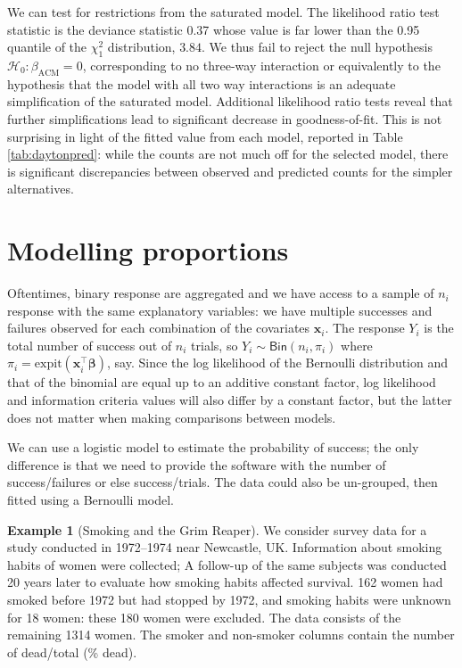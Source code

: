 \documentclass[
  11pt,
  letterpaper,
]{book}
\theoremstyle{definition}
\theoremstyle{definition}
\newtheorem{example}{Example}[chapter]
\theoremstyle{definition}
\theoremstyle{definition}
\theoremstyle{remark}
\begin{document}
We can test for restrictions from the saturated model. The likelihood ratio test statistic is the deviance statistic 0.37 whose value is far lower than the 0.95 quantile of the \(\chi^2_1\) distribution, \(3.84\). We thus fail to reject the null hypothesis \(\mathscr{H}_0:\beta_{\mathrm{ACM}}=0\), corresponding to no three-way interaction or equivalently to the hypothesis that the model with all two way interactions is an adequate simplification of the saturated model. Additional likelihood ratio tests reveal that further simplifications lead to significant decrease in goodness-of-fit. This is not surprising in light of the fitted value from each model, reported in Table \ref{tab:daytonpred}: while the counts are not much off for the selected model, there is significant discrepancies between observed and predicted counts for the simpler alternatives.

\hypertarget{modelling-proportions}{%
\section{Modelling proportions}\label{modelling-proportions}}

Oftentimes, binary response are aggregated and we have access to a sample of \(n_i\) response with the same explanatory variables: we have multiple successes and failures observed for each combination of the covariates \(\mathbf{x}_i\). The response \(Y_i\) is the total number of success out of \(n_i\) trials, so \(Y_i \sim \mathsf{Bin}(n_i, \pi_i)\) where \(\pi_i = \mathrm{expit}(\mathbf{x}_i^\top\boldsymbol{\beta})\), say. Since the log likelihood of the Bernoulli distribution and that of the binomial are equal up to an additive constant factor, log likelihood and information criteria values will also differ by a constant factor, but the latter does not matter when making comparisons between models.

We can use a logistic model to estimate the probability of success; the only difference is that we need to provide the software with the number of success/failures or else success/trials. The data could also be un-grouped, then fitted using a Bernoulli model.

\begin{example}[Smoking and the Grim Reaper]
\protect\hypertarget{exm:smokingSimpson}{}{\label{exm:smokingSimpson} {} }We consider survey data for a study conducted in 1972--1974 near Newcastle, UK. Information about smoking habits of women were collected; A follow-up of the same subjects was conducted 20 years later to evaluate how smoking habits affected survival. 162 women had smoked before 1972 but had stopped by 1972, and smoking habits were unknown for 18 women: these 180 women were excluded.
The data consists of the remaining 1314 women. The smoker and non-smoker columns contain the number of dead/total (\% dead).
\end{example}
\end{document}
